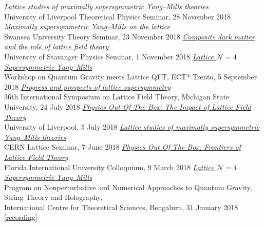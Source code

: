 \begin{spacelist}
\begin{revnumerate}
    \pagebreakitem
      \textit{\href{http://www.davidschaich.net/talks/1811Liverpool.pdf}{Lattice studies of maximally supersymmetric Yang--Mills theories}} \\
      University of Liverpool Theoretical Physics Seminar, 28 November 2018
    \pagebreakitem
      \textit{\href{http://www.davidschaich.net/talks/1811Swansea.pdf}{Maximally supersymmetric Yang--Mills on the lattice}} \\
      Swansea University Theory Seminar, 23 November 2018
    \pagebreakitem
      \textit{\href{http://www.davidschaich.net/talks/1811Stavanger.pdf}{Composite dark matter and the role of lattice field theory}} \\
      University of Stavanger Physics Seminar, 1 November 2018
    \pagebreakitem
      \textit{\href{http://www.davidschaich.net/talks/1809ECT.pdf}{Lattice $\mathcal N = 4$ Supersymmetric Yang--Mills}} \\
      Workshop on Quantum Gravity meets Lattice QFT, ECT* Trento, 5 September 2018
    \pagebreakitem
      \textit{\href{http://www.davidschaich.net/talks/1807Lattice.pdf}{Progress and prospects of lattice supersymmetry}} \\
      36th International Symposium on Lattice Field Theory, Michigan State University, 24 July 2018
    \pagebreakitem
      \textit{\href{http://www.davidschaich.net/talks/1807Liverpool.pdf}{Physics Out Of The Box: The Impact of Lattice Field Theory}} \\
      University of Liverpool, 5 July 2018
    \pagebreakitem
      \textit{\href{http://www.davidschaich.net/talks/1806CERN.pdf}{Lattice studies of maximally supersymmetric Yang--Mills theories}} \\
      CERN Lattice Seminar, 7 June 2018
    \pagebreakitem
      \textit{\href{http://www.davidschaich.net/talks/1803FIU.pdf}{Physics Out Of The Box: Frontiers of Lattice Field Theory}} \\
      Florida International University Colloquium, 9 March 2018
    \pagebreakitem
      \textit{\href{http://www.davidschaich.net/talks/1801Bangalore.pdf}{Lattice $\mathcal N = 4$ Supersymmetric Yang--Mills}} \\
      Program on Nonperturbative and Numerical Approaches to Quantum Gravity, String Theory and Holography, \\ International Centre for Theoretical Sciences, Bengaluru, 31 January 2018 [\href{https://www.youtube.com/watch?v=8M6AmatQLkk}{recording}] %
    \pagebreakitem

\end{revnumerate}
\end{spacelist}

